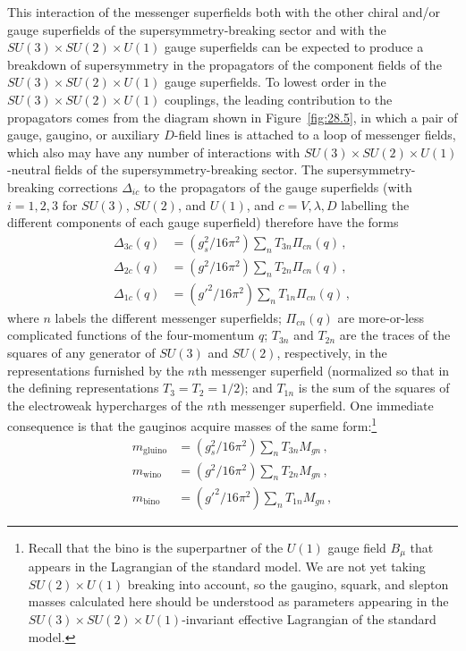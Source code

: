 This interaction of the messenger superfields both with the other chiral
and/or gauge superfields of the supersymmetry-breaking sector and with the
\(SU(3)\times SU(2)\times U(1)\) gauge superfields can be
expected to produce a breakdown of supersymmetry in the propagators of the
component fields of the
\(SU(3)\times SU(2)\times U(1)\) gauge superfields. To
lowest order in the \(SU(3)\times SU(2)\times U(1)\)
couplings, the leading contribution to the propagators comes from the
diagram shown in Figure~\ref{fig:28.5}, in which a pair of gauge, gaugino,
or auxiliary \(D\)-field lines is attached to a loop of messenger fields,
which also may have any number of interactions with
\(SU(3)\times SU(2)\times U(1)\)-neutral fields of the
supersymmetry-breaking sector. The supersymmetry-breaking corrections
\(\Delta_{ic}\) to the propagators of the gauge superfields (with
\(i=1,2,3\) for \(SU(3)\), \(SU(2)\), and \(U(1)\), and
\(c=V,\lambda,D\) labelling the different components of each gauge
superfield) therefore have the forms
\begin{equation}
  \begin{aligned}
    \Delta_{3c}(q)
      &=(g_s^2/16\pi^2)\sum_n T_{3n}\Pi_{cn}(q)\,,\\
    \Delta_{2c}(q)
      &=(g^2/16\pi^2)\sum_n T_{2n}\Pi_{cn}(q)\,,\\
    \Delta_{1c}(q)
      &=(g'^2/16\pi^2)\sum_n T_{1n}\Pi_{cn}(q)\,,
  \end{aligned}
  \tag{28.6.1}\label{eq:28.6.1}
\end{equation}
where \(n\) labels the different messenger superfields; \(\Pi_{cn}(q)\)
are more-or-less complicated functions of the four-momentum \(q\);
\(T_{3n}\) and \(T_{2n}\) are the traces of the squares of any generator of
\(SU(3)\) and \(SU(2)\), respectively, in the representations furnished by
the \(n\)th messenger superfield (normalized so that in the defining
representations \(T_3=T_2=1/2\)); and \(T_{1n}\) is the sum of the squares
of the electroweak hypercharges of the \(n\)th messenger superfield. One
immediate consequence is that the gauginos acquire masses of the same
form:\footnote{Recall that the bino is the superpartner of the \(U(1)\)
gauge field \(B_\mu\) that appears in the Lagrangian of the standard model.
We are not yet taking \(SU(2)\times U(1)\) breaking into account,
so the gaugino, squark, and slepton masses calculated here should be
understood as parameters appearing in the
\(SU(3)\times SU(2)\times U(1)\)-invariant effective
Lagrangian of the standard model.}
\begin{equation}
  \begin{aligned}
    m_{\mathrm{gluino}}
      &=(g_s^2/16\pi^2)\sum_n T_{3n}M_{gn}\,,\\
    m_{\mathrm{wino}}
      &=(g^2/16\pi^2)\sum_n T_{2n}M_{gn}\,,\\
    m_{\mathrm{bino}}
      &=(g'^2/16\pi^2)\sum_n T_{1n}M_{gn}\,,
  \end{aligned}
  \tag{28.6.2}\label{eq:28.6.2}
\end{equation}

